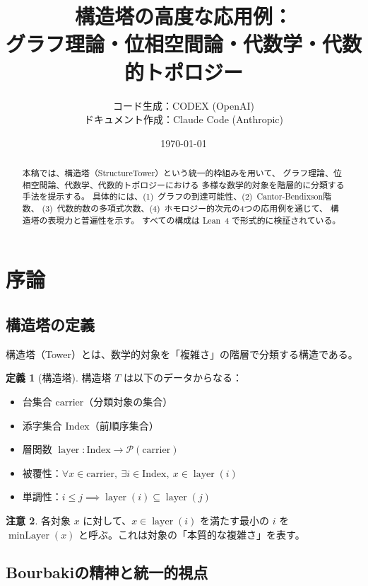 \documentclass[a4paper,12pt]{ltjsarticle}
\title{構造塔の高度な応用例：\\
グラフ理論・位相空間論・代数学・代数的トポロジー}
\author{%
  コード生成：CODEX (OpenAI)\\
  ドキュメント作成：Claude Code (Anthropic)
}
\date{\today}
\theoremstyle{definition}
\newtheorem{definition}{定義}[section]
\newtheorem{remark}[definition]{注意}
\DeclareMathOperator{\layer}{layer}
\DeclareMathOperator{\minLayer}{minLayer}
\begin{document}
\maketitle

\begin{abstract}
本稿では、構造塔（StructureTower）という統一的枠組みを用いて、
グラフ理論、位相空間論、代数学、代数的トポロジーにおける
多様な数学的対象を階層的に分類する手法を提示する。
具体的には、(1)~グラフの到達可能性、(2)~Cantor-Bendixson階数、
(3)~代数的数の多項式次数、(4)~ホモロジー的次元の4つの応用例を通じて、
構造塔の表現力と普遍性を示す。
すべての構成は Lean~4 で形式的に検証されている。
\end{abstract}

\tableofcontents

\section{序論}

\subsection{構造塔の定義}

構造塔（Tower）とは、数学的対象を「複雑さ」の階層で分類する構造である。

\begin{definition}[構造塔]
構造塔 $T$ は以下のデータからなる：
\begin{itemize}
  \item 台集合 $\mathrm{carrier}$（分類対象の集合）
  \item 添字集合 $\mathrm{Index}$（前順序集合）
  \item 層関数 $\layer : \mathrm{Index} \to \mathcal{P}(\mathrm{carrier})$
  \item 被覆性：$\forall x \in \mathrm{carrier},\ \exists i \in \mathrm{Index},\ x \in \layer(i)$
  \item 単調性：$i \leq j \implies \layer(i) \subseteq \layer(j)$
\end{itemize}
\end{definition}

\begin{remark}
各対象 $x$ に対して、$x \in \layer(i)$ を満たす最小の $i$ を
$\minLayer(x)$ と呼ぶ。これは対象の「本質的な複雑さ」を表す。
\end{remark}

\subsection{Bourbakiの精神と統一的視点}
\end{document}
